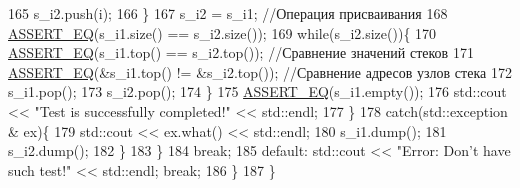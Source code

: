 \begin{DoxyCode}
165                         s\_i2.push(i);
166                     \}
167                     s\_i2 = s\_i1;                               \textcolor{comment}{//Операция присваивания}
168                     \hyperlink{main__file_8cpp_a12d9e096a8640ee0477e1cb3505c21b3}{ASSERT\_EQ}(s\_i1.size() == s\_i2.size());
169                     \textcolor{keywordflow}{while}(s\_i2.size())\{
170                         \hyperlink{main__file_8cpp_a12d9e096a8640ee0477e1cb3505c21b3}{ASSERT\_EQ}(s\_i1.top() == s\_i2.top());   \textcolor{comment}{//Сравнение значений стеков}
171                         \hyperlink{main__file_8cpp_a12d9e096a8640ee0477e1cb3505c21b3}{ASSERT\_EQ}(&s\_i1.top() != &s\_i2.top()); \textcolor{comment}{//Сравнение адресов узлов стека}
172                         s\_i1.pop();
173                         s\_i2.pop();
174                     \}
175                     \hyperlink{main__file_8cpp_a12d9e096a8640ee0477e1cb3505c21b3}{ASSERT\_EQ}(s\_i1.empty());
176                     std::cout << \textcolor{stringliteral}{"Test is successfully completed!"} << std::endl;
177                 \}
178                 \textcolor{keywordflow}{catch}(std::exception & ex)\{
179                     std::cout << ex.what() << std::endl;
180                     s\_i1.dump();
181                     s\_i2.dump();
182                 \}
183                                            \}
184                 \textcolor{keywordflow}{break};
185             \textcolor{keywordflow}{default}: std::cout << \textcolor{stringliteral}{"Error: Don't have such test!"} << std::endl; \textcolor{keywordflow}{break}; 
186         \}
187     \}
\end{DoxyCode}
